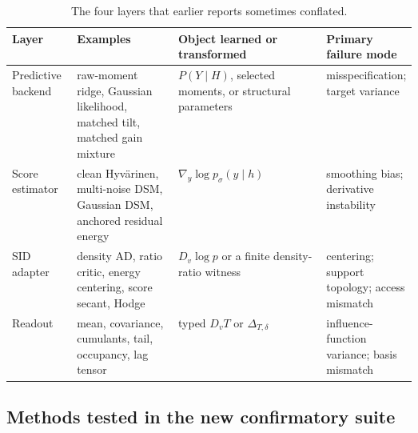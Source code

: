 \documentclass[11pt]{article}
\begin{document}
\begin{table}[H]
\centering\small
\caption{The four layers that earlier reports sometimes conflated.}
\begin{tabularx}{\linewidth}{p{0.16\linewidth}p{0.25\linewidth}X p{0.18\linewidth}}
\toprule
Layer & Examples & Object learned or transformed & Primary failure mode\\
\midrule
Predictive backend & raw-moment ridge, Gaussian likelihood, matched tilt, matched
gain mixture & $P(Y\mid H)$, selected moments, or structural parameters &
misspecification; target variance\\
Score estimator & clean Hyv\"arinen, multi-noise DSM, Gaussian DSM, anchored
residual energy & $\nabla_y\log p_\sigma(y\mid h)$ & smoothing bias; derivative
instability\\
SID adapter & density AD, ratio critic, energy centering, score secant, Hodge &
$D_v\log p$ or a finite density-ratio witness & centering; support topology;
access mismatch\\
Readout & mean, covariance, cumulants, tail, occupancy, lag tensor & typed
$D_vT$ or $\Delta_{T,\delta}$ & influence-function variance; basis mismatch\\
\bottomrule
\end{tabularx}
\end{table}

\subsection{Methods tested in the new confirmatory suite}
\end{document}
